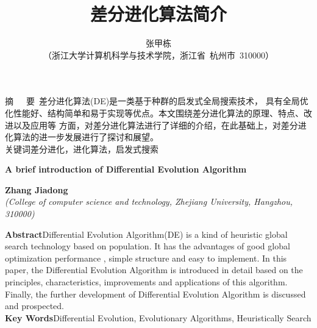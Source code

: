 \documentclass[a4paper,11pt,onecolumn,twoside]{article}
\title{\huge{差分进化算法简介}}
\author{张甲栋 \\[2pt]
\normalsize
（浙江大学计算机科学与技术学院，浙江省~杭州市~310000） \\[2pt]}
\date{}  %
\begin{document}
\begin{CJK*}{GBK}{song}

\newcommand{\supercite}[1]{\textsuperscript{\cite{#1}}}

\maketitle

\setlength{\oddsidemargin}{ 1cm}  %
\setlength{\evensidemargin}{\oddsidemargin}
\setlength{\textwidth}{13.50cm}
\vspace{-.8cm}
\begin{center}
\parbox{\textwidth}{
摘~~~要\quad {}~差分进化算法(DE)是一类基于种群的启发式全局搜索技术，
具有全局优化性能好、结构简单和易于实现等优点。本文围绕差分进化算法的原理、特点、改进以及应用等
方面，对差分进化算法进行了详细的介绍，在此基础上，对差分进化算法的进一步发展进行了探讨和展望。\\
关键词\quad{}差分进化，进化算法，启发式搜索}
\end{center}

\vspace{.1cm}
\begin{center}
\parbox{\textwidth}{
{\large{\textbf{A brief introduction of Differential Evolution Algorithm}}}\\
\vspace{-0.5cm}
\begin{center}
\textbf{Zhang Jiadong}\\[2pt]
\small{\textit{(College of computer science and technology, Zhejiang University, Hangzhou, 310000)}}\\[2pt]
\end{center}
{\small{\textbf{Abstract}\quad Differential Evolution Algorithm(DE) is a kind of heuristic global search 
technology based on population. It has the advantages of good global optimization performance , simple 
structure and easy to implement. In this paper, the Differential Evolution Algorithm is introduced in detail 
based on the principles, characteristics, improvements and applications of this algorithm. Finally, the further 
development of Differential Evolution Algorithm is discussed and prospected. \\
\textbf{Key Words}\quad Differential Evolution, Evolutionary Algorithms, Heuristically Search}}
}
\end{center}



\end{CJK*}
\end{document}
